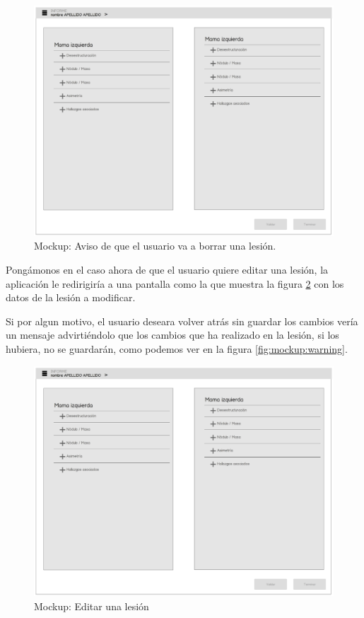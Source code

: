 \begin{figure}[ht]
\centering
\includegraphics[page=8,scale=0.4]{./imgs/mockup/mockup.pdf}
\caption{Mockup: Aviso de que el usuario va a borrar una lesión.}
\label{fig:mockup:delete}
\end{figure}

Pongámonos en el caso ahora de que el usuario quiere editar una lesión, la aplicación le redirigiría a una pantalla como la que muestra la figura \ref{fig:mockup:edit} con los datos de la lesión a modificar.\par
Si por algun motivo, el usuario deseara volver atrás sin guardar los cambios vería un mensaje advirtiéndolo que los cambios que ha realizado en la lesión, si los hubiera, no se guardarán, como podemos ver en la figura \ref{fig:mockup:warning}.\par

\begin{figure}[ht]
\centering
\includegraphics[page=10,scale=0.4]{./imgs/mockup/mockup.pdf}
\caption{Mockup: Editar una lesión}
\label{fig:mockup:edit}
\end{figure}


